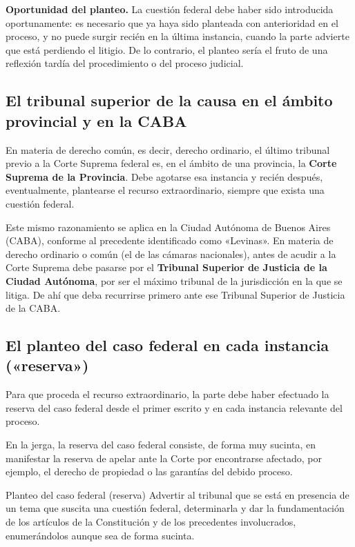 \documentclass[12pt,oneside]{book}
\begin{document}
\textbf{Oportunidad del planteo.} La cuestión federal debe haber sido introducida oportunamente: es necesario que ya haya sido planteada con anterioridad en el proceso, y no puede surgir recién en la última instancia, cuando la parte advierte que está perdiendo el litigio. De lo contrario, el planteo sería el fruto de una reflexión tardía del procedimiento o del proceso judicial.

\subsection{El tribunal superior de la causa en el ámbito provincial y en la CABA}

En materia de derecho común, es decir, derecho ordinario, el último tribunal previo a la Corte Suprema federal es, en el ámbito de una provincia, la \textbf{Corte Suprema de la Provincia}. Debe agotarse esa instancia y recién después, eventualmente, plantearse el recurso extraordinario, siempre que exista una cuestión federal.

Este mismo razonamiento se aplica en la Ciudad Autónoma de Buenos Aires (CABA), conforme al precedente identificado como «Levinas». En materia de derecho ordinario o común (el de las cámaras nacionales), antes de acudir a la Corte Suprema debe pasarse por el \textbf{Tribunal Superior de Justicia de la Ciudad Autónoma}, por ser el máximo tribunal de la jurisdicción en la que se litiga. De ahí que deba recurrirse primero ante ese Tribunal Superior de Justicia de la CABA.

\subsection{El planteo del caso federal en cada instancia («reserva»)}

Para que proceda el recurso extraordinario, la parte debe haber efectuado la reserva del caso federal desde el primer escrito y en cada instancia relevante del proceso.

En la jerga, la reserva del caso federal consiste, de forma muy sucinta, en manifestar la reserva de apelar ante la Corte por encontrarse afectado, por ejemplo, el derecho de propiedad o las garantías del debido proceso.

\begin{definition}{Planteo del caso federal (reserva)}
Advertir al tribunal que se está en presencia de un tema que suscita una cuestión federal, determinarla y dar la fundamentación de los artículos de la Constitución y de los precedentes involucrados, enumerándolos aunque sea de forma sucinta.
\end{definition}
\end{document}
